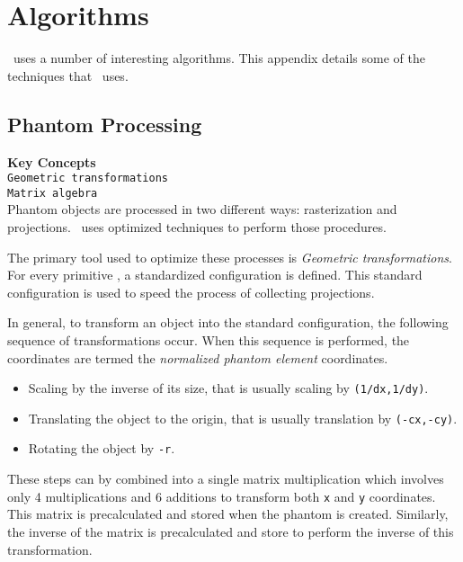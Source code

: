 \chapter{Algorithms}\label{algorihms}
%
\ctsimfooter%

\ctsim\ uses a number of interesting algorithms. This appendix details some
of the techniques that \ctsim\ uses.

\section{Phantom Processing}\label{phantomprocessing}
\textbf{Key Concepts}\\
\hspace*{1cm}\texttt{Geometric transformations}\\
\hspace*{1cm}\texttt{Matrix algebra}\\

Phantom objects are processed in two different ways: rasterization
and projections. \ctsim\ uses optimized techniques to perform
those procedures.

The primary tool used to optimize these processes is
\emph{Geometric transformations}. For every primitive
, a standardized
configuration is defined. This standard configuration is used to
speed the process of collecting projections.

In general, to transform an object into the standard
configuration, the following sequence of transformations occur.
When this sequence is performed, the coordinates are termed the
\emph{normalized phantom element} coordinates.

\begin{itemize}
\item Scaling by the inverse of its size, that is usually
scaling by \texttt{(1/dx,1/dy)}.
\item Translating the object to the origin, that is usually translation by
\texttt{(-cx,-cy)}.
\item Rotating the object by \texttt{-r}.
\end{itemize}

These steps can by combined into a single matrix multiplication
which involves only 4 multiplications and 6 additions to transform
both \texttt{x} and \texttt{y} coordinates. This matrix is
precalculated and stored when the phantom is created. Similarly,
the inverse of the matrix is precalculated and store to perform
the inverse of this transformation.

